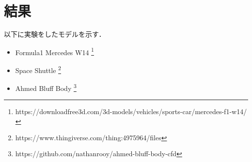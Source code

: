 \documentclass[main]{subfiles}
\begin{document}
\chapter{結果}

以下に実験をしたモデルを示す．

\begin{itemize}
    \item Formula1 Mercedes W14 \footnote{https://downloadfree3d.com/3d-models/vehicles/sports-car/mercedes-f1-w14/}
    \item Space Shuttle \footnote{https://www.thingiverse.com/thing:4975964/files}
    \item Ahmed Bluff Body \footnote{https://github.com/nathanrooy/ahmed-bluff-body-cfd}
\end{itemize}
\end{document}
